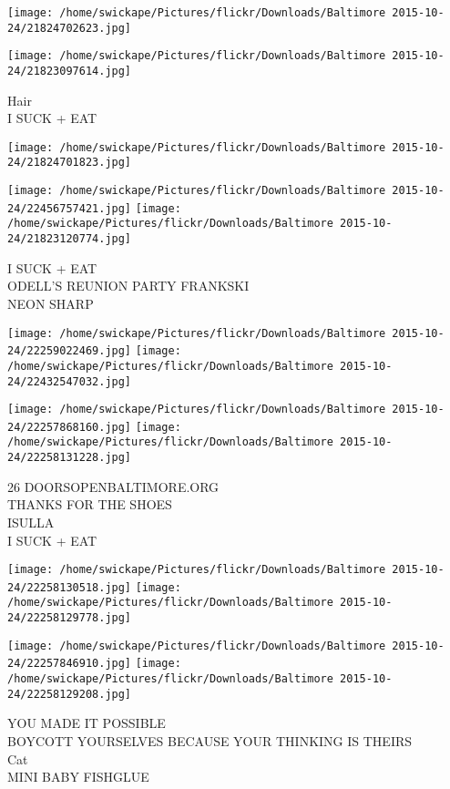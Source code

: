 \documentclass[10pt,letterpaper]{article}
\begin{document}
\texttt{[image: /home/swickape/Pictures/flickr/Downloads/Baltimore 2015-10-24/21824702623.jpg]}

\vspace{0.25in}
\texttt{[image: /home/swickape/Pictures/flickr/Downloads/Baltimore 2015-10-24/21823097614.jpg]}

Hair\\
I SUCK + EAT
\pagebreak

\texttt{[image: /home/swickape/Pictures/flickr/Downloads/Baltimore 2015-10-24/21824701823.jpg]}

\vspace{0.25in}
\texttt{[image: /home/swickape/Pictures/flickr/Downloads/Baltimore 2015-10-24/22456757421.jpg]}
\texttt{[image: /home/swickape/Pictures/flickr/Downloads/Baltimore 2015-10-24/21823120774.jpg]}

I SUCK + EAT\\
ODELL'S REUNION PARTY FRANKSKI\\
NEON SHARP
\pagebreak

\texttt{[image: /home/swickape/Pictures/flickr/Downloads/Baltimore 2015-10-24/22259022469.jpg]}
\texttt{[image: /home/swickape/Pictures/flickr/Downloads/Baltimore 2015-10-24/22432547032.jpg]}

\texttt{[image: /home/swickape/Pictures/flickr/Downloads/Baltimore 2015-10-24/22257868160.jpg]}
\texttt{[image: /home/swickape/Pictures/flickr/Downloads/Baltimore 2015-10-24/22258131228.jpg]}

26 DOORSOPENBALTIMORE.ORG\\
THANKS FOR THE SHOES\\
ISULLA\\
I SUCK + EAT
\pagebreak

\texttt{[image: /home/swickape/Pictures/flickr/Downloads/Baltimore 2015-10-24/22258130518.jpg]}
\texttt{[image: /home/swickape/Pictures/flickr/Downloads/Baltimore 2015-10-24/22258129778.jpg]}

\texttt{[image: /home/swickape/Pictures/flickr/Downloads/Baltimore 2015-10-24/22257846910.jpg]}
\texttt{[image: /home/swickape/Pictures/flickr/Downloads/Baltimore 2015-10-24/22258129208.jpg]}

YOU MADE IT POSSIBLE\\
BOYCOTT YOURSELVES BECAUSE YOUR THINKING IS THEIRS\\
Cat\\
MINI BABY FISHGLUE
\pagebreak
\end{document}
